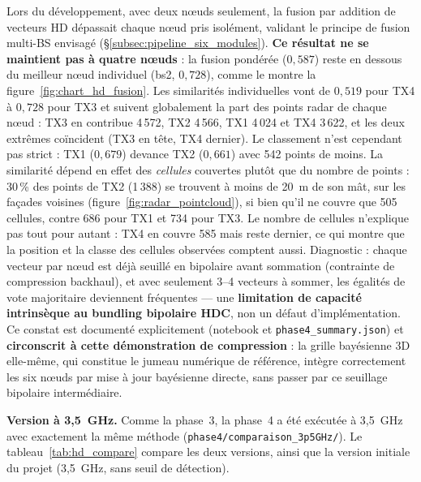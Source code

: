 \documentclass[12pt,a4paper,titlepage]{article}
\begin{document}
Lors du développement, avec deux n\oe uds seulement, la fusion par addition de vecteurs HD dépassait chaque n\oe ud pris isolément, validant le principe de fusion multi-BS envisagé (\S\ref{subsec:pipeline_six_modules}). \textbf{Ce résultat ne se maintient pas à quatre n\oe uds} : la fusion pondérée ($0{,}587$) reste en dessous du meilleur n\oe ud individuel (bs2, $0{,}728$), comme le montre la figure~\ref{fig:chart_hd_fusion}. Les similarités individuelles vont de $0{,}519$ pour TX4 à $0{,}728$ pour TX3 et suivent globalement la part des points radar de chaque n\oe ud : TX3 en contribue 4\,572, TX2 4\,566, TX1 4\,024 et TX4 3\,622, et les deux extrêmes coïncident (TX3 en tête, TX4 dernier). Le classement n'est cependant pas strict : TX1 ($0{,}679$) devance TX2 ($0{,}661$) avec 542 points de moins. La similarité dépend en effet des \emph{cellules} couvertes plutôt que du nombre de points : 30\,\% des points de TX2 (1\,388) se trouvent à moins de 20~m de son mât, sur les façades voisines (figure~\ref{fig:radar_pointcloud}), si bien qu'il ne couvre que 505 cellules, contre 686 pour TX1 et 734 pour TX3. Le nombre de cellules n'explique pas tout pour autant : TX4 en couvre 585 mais reste dernier, ce qui montre que la position et la classe des cellules observées comptent aussi. Diagnostic : chaque vecteur par n\oe ud est déjà seuillé en bipolaire avant sommation (contrainte de compression backhaul), et avec seulement 3--4 vecteurs à sommer, les égalités de vote majoritaire deviennent fréquentes --- une \textbf{limitation de capacité intrinsèque au bundling bipolaire HDC}, non un défaut d'implémentation. Ce constat est documenté explicitement (notebook et \texttt{phase4\_summary.json}) et \textbf{circonscrit à cette démonstration de compression} : la grille bayésienne 3D elle-même, qui constitue le jumeau numérique de référence, intègre correctement les six n\oe uds par mise à jour bayésienne directe, sans passer par ce seuillage bipolaire intermédiaire.

\textbf{Version à 3,5~GHz.} Comme la phase~3, la phase~4 a été exécutée à 3,5~GHz avec exactement la même méthode (\texttt{phase4/comparaison\_3p5GHz/}). Le tableau~\ref{tab:hd_compare} compare les deux versions, ainsi que la version initiale du projet (3,5~GHz, sans seuil de détection).
\end{document}
